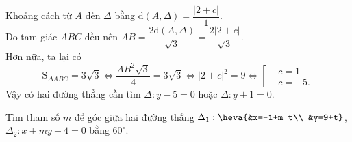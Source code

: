 \begin{bt}
{	Khoảng cách từ $A$ đến $\Delta$ bằng $\mathrm{d}\left(A,\Delta\right)=\dfrac{\left|2+c\right|}{1}$.\\
	Do tam giác $ABC$ đều nên $AB=\dfrac{2\mathrm{d}\left(A,\Delta\right)}{\sqrt {3}}=\dfrac{2\left|2+c\right|}{\sqrt{3}}$.\\
	Hơn nữa, ta lại có
	$$\mathrm{S}_{\Delta ABC}=3\sqrt{3}\Leftrightarrow\dfrac{A{B^2}\sqrt {3}}{4}=3\sqrt{3}\Leftrightarrow{\left|2+c\right|^2}=9\Leftrightarrow\left[\begin{aligned}&c=1\\&c=-5.\end{aligned}\right.$$
	Vậy có hai đường thẳng cần tìm $\Delta :y-5=0$ hoặc $\Delta :y+1=0$.}
\end{bt}

\begin{bt}%
	Tìm tham số $m$ để góc giữa hai đường thẳng $\Delta_1:\heva{&x=-1+m t\\ &y=9+t}$, $\Delta_2: x+m y-4=0$ bằng $60^\circ $.
\end{bt}

